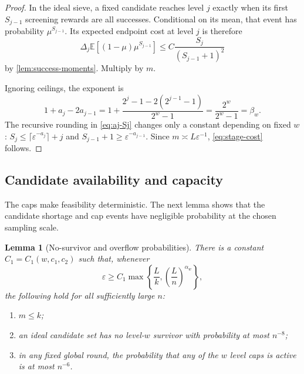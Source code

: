 \documentclass[11pt,letterpaper]{article}
\numberwithin{equation}{section}
\newtheorem{lemma}[lemma]{Lemma}
\theoremstyle{definition}
\theoremstyle{remark}
\newcommand{\E}{\mathbb{E}}
\newcommand{\1}{\mathbf{1}}
\newcommand{\eps}{\varepsilon}
\begin{document}
\begin{proof}
In the ideal sieve, a fixed candidate reaches level $j$ exactly when its
first $S_{j-1}$ screening rewards are all successes.  Conditional on its mean, that event has probability
$\mu^{S_{j-1}}$.  Its expected endpoint cost at level $j$ is therefore
\[
  \Delta_j\E[(1-\mu)\mu^{S_{j-1}}]
  \le C\frac{S_j}{(S_{j-1}+1)^2}
\]
by \cref{lem:success-moments}.  Multiply by $m$.

Ignoring ceilings, the exponent is
\[
  1+a_j-2a_{j-1}
  =1+\frac{2^j-1-2(2^{j-1}-1)}{2^w-1}
  =\frac{2^w}{2^w-1}
  =\beta_w.
\]
The recursive rounding in \cref{eq:aj-Sj} changes only a constant depending
on fixed $w$: $S_j\le \lceil\eps^{-a_j}\rceil+j$ and
$S_{j-1}+1\ge\eps^{-a_{j-1}}$.  Since $m\asymp L\eps^{-1}$,
\cref{eq:stage-cost} follows.
\end{proof}

\subsection{Candidate availability and capacity}

The caps make feasibility deterministic. The next lemma shows that the
candidate shortage and cap events have negligible probability at the chosen
sampling scale.

\begin{lemma}[No-survivor and overflow probabilities]\label{lem:upper-feasibility}
There is a constant $C_1=C_1(w,c_1,c_2)$ such that, whenever
\begin{equation}\label{eq:eps-condition}
  \eps\ge C_1\max\left\{\frac{L}{k},
       \left(\frac{L}{n}\right)^{\alpha_w}\right\},
\end{equation}
the following hold for all sufficiently large $n$:
\begin{enumerate}[label=(\alph*),leftmargin=2em]
  \item $m\le k$;
  \item an ideal candidate set has no level-$w$ survivor with probability at
        most $n^{-8}$;
  \item in any fixed global round, the probability that any of the $w$ level
        caps is active is at most $n^{-6}$.
\end{enumerate}
\end{lemma}
\end{document}

